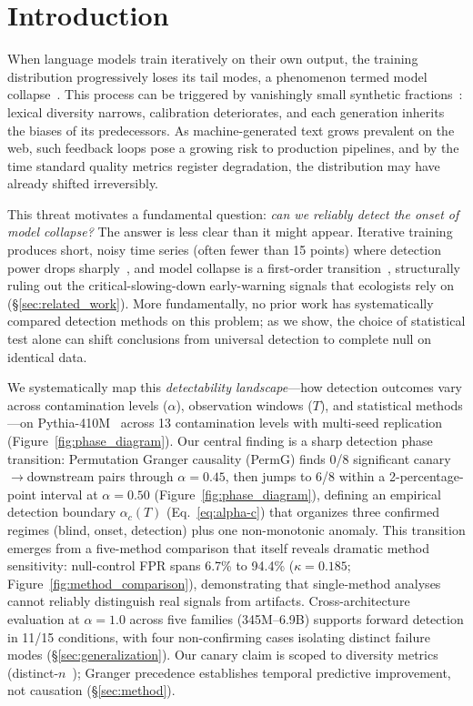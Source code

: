 \section{Introduction}
\label{sec:introduction}

When language models train iteratively on their own output, the training distribution progressively loses its tail modes, a phenomenon termed model collapse~\citep{shumailov2024curse,alemohammad2024mad}.
This process can be triggered by vanishingly small synthetic fractions~\citep{dohmatob2025strong}: lexical diversity narrows, calibration deteriorates, and each generation inherits the biases of its predecessors.
As machine-generated text grows prevalent on the web, such feedback loops pose a growing risk to production pipelines, and by the time standard quality metrics register degradation, the distribution may have already shifted irreversibly.

This threat motivates a fundamental question: \emph{can we reliably detect the onset of model collapse?}
The answer is less clear than it might appear.
Iterative training produces short, noisy time series (often fewer than 15 points) where detection power drops sharply~\citep{boettiger2012limits}, and model collapse is a first-order transition~\citep{truong2026phase}, structurally ruling out the critical-slowing-down early-warning signals that ecologists rely on~\citep{scheffer2009early} (\S\ref{sec:related_work}).
More fundamentally, no prior work has systematically compared detection methods on this problem; as we show, the choice of statistical test alone can shift conclusions from universal detection to complete null on identical data.

We systematically map this \emph{detectability landscape}---how detection outcomes vary across contamination levels ($\alpha$), observation windows ($T$), and statistical methods---on Pythia-410M~\citep{biderman2023pythia} across 13 contamination levels with multi-seed replication (Figure~\ref{fig:phase_diagram}).
Our central finding is a sharp detection phase transition: Permutation Granger causality (PermG) finds 0/8 significant canary$\to$downstream pairs through $\alpha{=}0.45$, then jumps to 6/8 within a 2-percentage-point interval at $\alpha{=}0.50$ (Figure~\ref{fig:phase_diagram}), defining an empirical detection boundary $\alpha_c(T)$ (Eq.~\ref{eq:alpha-c}) that organizes three confirmed regimes (blind, onset, detection) plus one non-monotonic anomaly.
This transition emerges from a five-method comparison that itself reveals dramatic method sensitivity: null-control FPR spans 6.7\% to 94.4\% ($\kappa{=}0.185$; Figure~\ref{fig:method_comparison}), demonstrating that single-method analyses cannot reliably distinguish real signals from artifacts.
Cross-architecture evaluation at $\alpha{=}1.0$ across five families (345M--6.9B) supports forward detection in 11/15 conditions, with four non-confirming cases isolating distinct failure modes (\S\ref{sec:generalization}).
Our canary claim is scoped to diversity metrics (distinct-$n$~\citep{li2016diversity}); Granger precedence establishes temporal predictive improvement, not causation (\S\ref{sec:method}).


